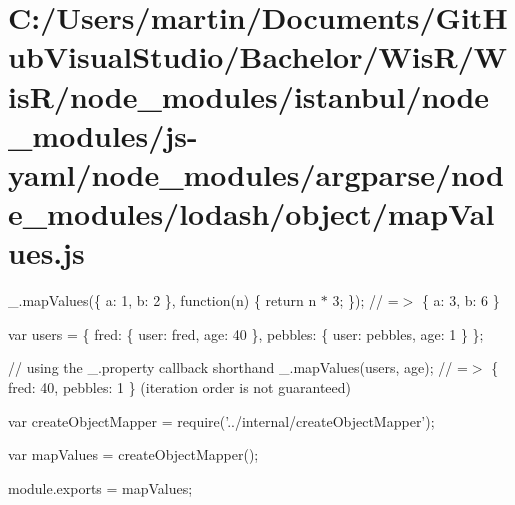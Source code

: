 \hypertarget{_c_1_2_users_2martin_2_documents_2_git_hub_visual_studio_2_bachelor_2_wis_r_2_wis_r_2node_moduled7c39335c1b0db6ef1c19fba989f3a13}{}\section{C\+:/\+Users/martin/\+Documents/\+Git\+Hub\+Visual\+Studio/\+Bachelor/\+Wis\+R/\+Wis\+R/node\+\_\+modules/istanbul/node\+\_\+modules/js-\/yaml/node\+\_\+modules/argparse/node\+\_\+modules/lodash/object/map\+Values.\+js}
\+\_\+.\+map\+Values(\{ \textquotesingle{}a\textquotesingle{}\+: 1, \textquotesingle{}b\textquotesingle{}\+: 2 \}, function(n) \{ return n $\ast$ 3; \}); // =$>$ \{ \textquotesingle{}a\textquotesingle{}\+: 3, \textquotesingle{}b\textquotesingle{}\+: 6 \}

var users = \{ \textquotesingle{}fred\textquotesingle{}\+: \{ \textquotesingle{}user\textquotesingle{}\+: \textquotesingle{}fred\textquotesingle{}, \textquotesingle{}age\textquotesingle{}\+: 40 \}, \textquotesingle{}pebbles\textquotesingle{}\+: \{ \textquotesingle{}user\textquotesingle{}\+: \textquotesingle{}pebbles\textquotesingle{}, \textquotesingle{}age\textquotesingle{}\+: 1 \} \};

// using the {\ttfamily \+\_\+.\+property} callback shorthand \+\_\+.\+map\+Values(users, \textquotesingle{}age\textquotesingle{}); // =$>$ \{ \textquotesingle{}fred\textquotesingle{}\+: 40, \textquotesingle{}pebbles\textquotesingle{}\+: 1 \} (iteration order is not guaranteed)


\begin{DoxyCodeInclude}
var createObjectMapper = require(\textcolor{stringliteral}{'../internal/createObjectMapper'});

var mapValues = createObjectMapper();

module.exports = mapValues;
\end{DoxyCodeInclude}
 